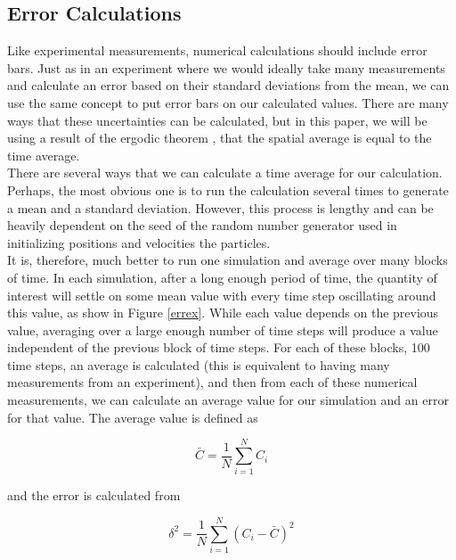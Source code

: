 \documentclass{article}
\begin{document}
\begin{multicols}{2}
\appendix 

\section{Error Calculations}
\label{errorcalc}

Like experimental measurements, numerical calculations should include error bars.  Just as in an experiment where we would ideally take many measurements and calculate an error based on their standard deviations from the mean, we can use the same concept to put error bars on our calculated values.  There are many ways that these uncertainties can be calculated, but in this paper, we will be using a result of the ergodic theorem \cite{Birkhoff}, that the spatial average is equal to the time average.  \\

There are several ways that we can calculate a time average for our calculation.  Perhaps, the most obvious one is to run the calculation several times to generate a mean and a standard deviation.  However, this process is lengthy and can be heavily dependent on the seed of the random number generator used in initializing positions and velocities the particles.  \\



It is, therefore, much better to run one simulation and average over many blocks of time.  In each simulation, after a long enough period of time, the quantity of interest will settle on some mean value with every time step oscillating around this value, as show in Figure \ref{errex}.  While each value depends on the previous value, averaging over a large enough number of time steps will produce a value independent of the previous block of time steps.  For each of these blocks, 100 time steps, an average is calculated (this is equivalent to having many measurements from an experiment), and then from each of these numerical measurements, we can calculate an average value for our simulation and an error for that value.  The average value is defined as 

\begin{equation}
\bar{C} = \frac{1}{N}\sum \limits _{i=1}^N C_i 
\end{equation}

\noindent and the error is calculated from 

\begin{equation}
\delta ^2 = \frac{1}{N}\sum \limits _{i=1}^N (C_i - \bar{C})^2
\end{equation}


\end{multicols}
\end{document}

